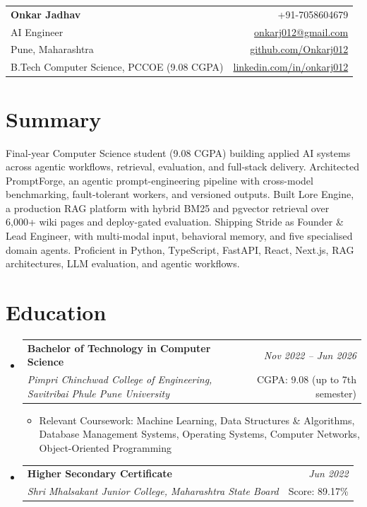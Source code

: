 \documentclass[a4paper,11pt]{article}
\makeatletter
\newcommand{\resumeSubheading}[4]{
\vspace{0.5mm}\item
    \begin{tabular*}{0.98\textwidth}[t]{l@{\extracolsep{\fill}}r}
        \textbf{#1} & \textit{\footnotesize{#4}} \\
        \textit{\footnotesize{#3}} & \footnotesize{#2}\\
    \end{tabular*}
    \vspace{-2.4mm}
}
\newcommand{\resumeSubHeadingListStart}{\begin{itemize}[leftmargin=*,labelsep=0mm]}
\newcommand{\resumeItemListStart}{\begin{justify}\begin{itemize}[leftmargin=3ex, rightmargin=2ex, noitemsep,labelsep=1.2mm,itemsep=0mm]\small}
\newcommand{\resumeSubHeadingListEnd}{\end{itemize}\vspace{2mm}}
\newcommand{\resumeItemListEnd}{\end{itemize}\end{justify}\vspace{-2mm}}
\newcommand{\name}{Onkar Jadhav}
\newcommand{\phone}{7058604679}
\newcommand{\emaila}{onkarj012@gmail.com}
\newcommand{\github}{github.com/Onkarj012}
\newcommand{\linkedin}{linkedin.com/in/onkarj012}
\makeatother
\begin{document}
\selectfont

\begin{tabularx}{\linewidth}{L r}
  \textbf{\Large \name} & {+91-\phone}\\
  {AI Engineer} & \href{mailto:\emaila}{\emaila} \\
  {Pune, Maharashtra} & \href{https://\github}{\github} \\
  {B.Tech Computer Science, PCCOE (9.08 CGPA)} & \href{https://\linkedin}{\linkedin}
\end{tabularx}
\vspace{-4mm}

\section{\textbf{Summary}}
\vspace{1mm}
\small{
Final-year Computer Science student (9.08 CGPA) building applied AI systems across agentic workflows, retrieval, evaluation, and full-stack delivery. Architected PromptForge, an agentic prompt-engineering pipeline with cross-model benchmarking, fault-tolerant workers, and versioned outputs. Built Lore Engine, a production RAG platform with hybrid BM25 and pgvector retrieval over 6,000+ wiki pages and deploy-gated evaluation. Shipping Stride as Founder \& Lead Engineer, with multi-modal input, behavioral memory, and five specialised domain agents. Proficient in Python, TypeScript, FastAPI, React, Next.js, RAG architectures, LLM evaluation, and agentic workflows.
}
\vspace{-3mm}

\section{\textbf{Education}}
  \resumeSubHeadingListStart
    \resumeSubheading
      {Bachelor of Technology in Computer Science}{CGPA: 9.08 (up to 7th semester)}
      {Pimpri Chinchwad College of Engineering, Savitribai Phule Pune University}{Nov 2022 -- Jun 2026}
      \resumeItemListStart
        \item {Relevant Coursework: Machine Learning, Data Structures \& Algorithms, Database Management Systems, Operating Systems, Computer Networks, Object-Oriented Programming}
      \resumeItemListEnd
    \resumeSubheading
      {Higher Secondary Certificate}{Score: 89.17\%}
      {Shri Mhalsakant Junior College, Maharashtra State Board}{Jun 2022}
  \resumeSubHeadingListEnd
\vspace{-5.5mm}
\end{document}
